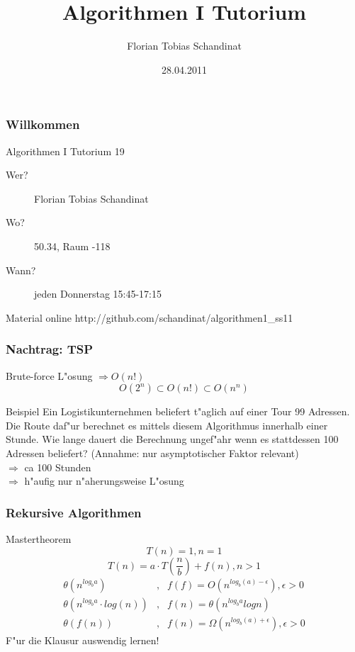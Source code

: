 \documentclass{beamer}
\title{Algorithmen I Tutorium}
\author{Florian Tobias Schandinat}
\date{28.04.2011}
\institute{FTS}
\begin{document}
\begin{frame}
\frametitle{Willkommen}
\begin{block}{Algorithmen I Tutorium 19}
\begin{description}
\item[Wer?] Florian Tobias Schandinat\\
\item[Wo?] 50.34, Raum -118\\
\item[Wann?] jeden Donnerstag 15:45-17:15
\end{description}
\end{block}

\begin{block}{Material online}
http://github.com/schandinat/algorithmen1\_ss11
\end{block}
\end{frame}


\begin{frame}
\frametitle{Nachtrag: TSP}
\begin{block}{Brute-force L"osung}
\pause
$\Rightarrow O(n!)$
$$O(2^n) \subset O(n!) \subset O(n^n)$$
\end{block}

\pause

\begin{exampleblock}{Beispiel}
Ein Logistikunternehmen beliefert t"aglich auf einer Tour 99 Adressen. Die Route daf"ur berechnet es mittels diesem Algorithmus innerhalb einer Stunde. Wie lange dauert die Berechnung ungef"ahr wenn es stattdessen 100 Adressen beliefert? (Annahme: nur asymptotischer Faktor relevant)\\
\pause
$\Rightarrow$ \alert{ca 100 Stunden}\\
$\Longrightarrow$ h"aufig nur n"aherungsweise L"osung
\end{exampleblock}
\end{frame}


\begin{frame}
\frametitle{Rekursive Algorithmen}
\begin{block}{Mastertheorem}
$$T(n) = 1, n = 1$$
$$T(n) = a \cdot T\left(\frac{n}{b}\right) + f(n), n > 1$$
\begin{eqnarray*}
\theta(n^{log_b a})&,& f(f) = O(n^{log_b(a)-\epsilon}), \epsilon > 0\\
\theta(n^{log_b a} \cdot log(n))&,& f(n) = \theta(n^{log_b a}log n)\\
\theta(f(n))&,& f(n) = \Omega(n^{log_b (a)+\epsilon}), \epsilon > 0
\end{eqnarray*}
\pause
\alert{F"ur die Klausur auswendig lernen!}
\end{block}
\end{frame}
\end{document}
